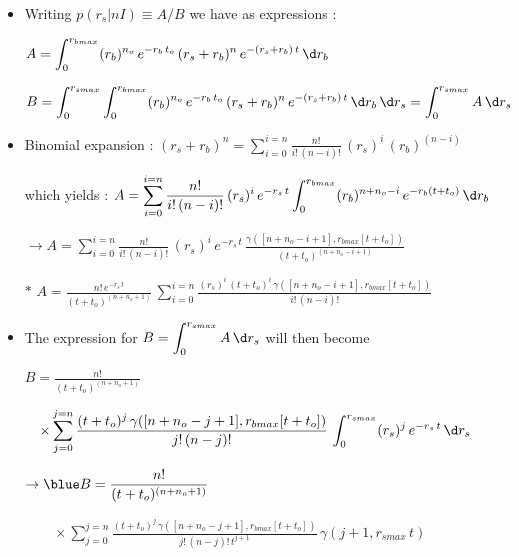 \Tr
\begin{itemize}
\item Writing {\blue $p(r_{s}|nI) \equiv A/B$} we have as expressions :
\item[] $\displaystyle A=\int_{0}^{r_{bmax}} (r_{b})^{n_{o}}\,e^{-r_{b}\,t_{o}}\,(r_{s}+r_{b})^{n}\,e^{-(r_{s}+r_{b})\,t}\,\d r_{b}$
\item[] $\displaystyle B=\int_{0}^{r_{smax}}\int_{0}^{r_{bmax}}
                         (r_{b})^{n_{o}}\,e^{-r_{b}\,t_{o}}\,(r_{s}+r_{b})^{n}\,e^{-(r_{s}+r_{b})\,t}\,\d r_{b}\,\d r_{s}
                         =\int_{0}^{r_{smax}} A\,\d r_{s}$
\item Binomial expansion : $\displaystyle (r_{s}+r_{b})^n=\sum_{i=0}^{i=n} \frac{n!}{i!\,(n-i)!}\, (r_{s})^{i}\,(r_{b})^{(n-i)}$
\item[] which yields :
        $\displaystyle A=\sum_{i=0}^{i=n} \frac{n!}{i!\,(n-i)!}\, (r_{s})^{i}\,e^{-r_{s}\,t}
         \int_{0}^{r_{bmax}} (r_{b})^{n+n_{o}-i}\,e^{-r_{b}(t+t_{o})}\,\d r_{b}$
\item[] $\displaystyle \rightarrow A=\sum_{i=0}^{i=n} \frac{n!}{i!\,(n-i)!}\, (r_{s})^{i}\,e^{-r_{s}\,t}
         \,\frac{\gamma([n+n_{o}-i+1],r_{bmax}[t+t_{o}])}{(t+t_{o})^{(n+n_{o}-i+1)}}$
\item[$\ast$] {\blue $\displaystyle A=\frac{n!\,e^{-r_{s}\,t}}{(t+t_{o})^{(n+n_{o}+1)}}
         \,\sum_{i=0}^{i=n} \frac{(r_{s})^{i}\,(t+t_{o})^{i}\,\gamma([n+n_{o}-i+1],r_{bmax}[t+t_{o}])}{i!\,(n-i)!}$}
\end{itemize}

\Tr
\begin{itemize}
\item The expression for $\displaystyle B=\int_{0}^{r_{smax}} A\,\d r_{s}$ will then become
\item[] $\displaystyle B=\frac{n!}{(t+t_{o})^{(n+n_{o}+1)}}$
\item[] $\displaystyle \quad \times \sum_{j=0}^{j=n} \frac{(t+t_{o})^{j}\,\gamma([n+n_{o}-j+1],r_{bmax}[t+t_{o}])}{j!\,(n-j)!}
         \,\int_{0}^{r_{smax}} (r_{s})^{j}\,e^{-r_{s}\,t}\,\d r_{s}$
\item[] $\displaystyle \rightarrow {\blue B=\frac{n!}{(t+t_{o})^{(n+n_{o}+1)}}}$
\item[] {\blue $\displaystyle \qquad \times \sum_{j=0}^{j=n} \frac{(t+t_{o})^{j}\,\gamma([n+n_{o}-j+1],r_{bmax}[t+t_{o}])}{j!\,(n-j)!\,t^{j+1}}
         \,\gamma(j+1,r_{smax}\,t)$}
\end{itemize}

